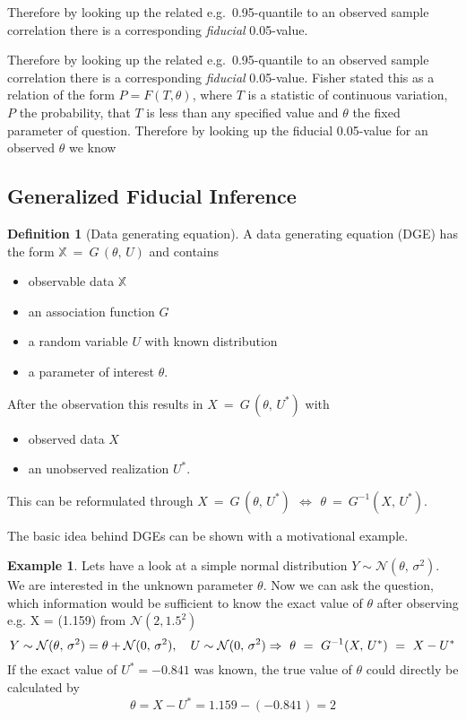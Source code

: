 \documentclass[
]{report}
\theoremstyle{definition}
\newtheorem{definition}{Definition}[section]
\newtheorem{example}{Example}[section]
\begin{document}
Therefore by looking up the related e.g.~0.95-quantile to an observed
sample correlation there is a corresponding \textit{fiducial}
0.05-value.

Therefore by looking up the related e.g.~0.95-quantile to an observed
sample correlation there is a corresponding \textit{fiducial}
0.05-value. Fisher stated this as a relation of the form
\(P = F(T, \theta)\), where \(T\) is a statistic of continuous
variation, \(P\) the probability, that \(T\) is less than any specified
value and \(\theta\) the fixed parameter of question. Therefore by
looking up the fiducial 0.05-value for an observed \(\theta\) we know

\subsection{Generalized Fiducial Inference}

\begin{definition}[Data generating equation]
A data generating equation (DGE) has the form $\mathbb{X} \ = \  G \, (\theta, \, U)$ and contains
\begin{itemize}
  \item observable data $\mathbb{X}$
  \item an association function $G$
  \item a random variable $U$ with known distribution
  \item a parameter of interest $\theta$.
\end{itemize}
After the observation this results in $X \ = \ G \, (\theta, \, U^*)$ with
\begin{itemize}
  \item observed data $X$
  \item an unobserved realization $U^*$.
\end{itemize}
\end{definition}

This can be reformulated through
\(X \ = \ G \, (\theta, \, U^*) \ \, \Leftrightarrow \ \, \theta \ = \ G^{-1}(X, \, U^*)\).

The basic idea behind DGEs can be shown with a motivational example.

\begin{example}
Lets have a look at a simple normal distribution $Y \sim \mathcal{N}(\theta,\, \sigma^2)$. We are interested in the unknown parameter $\theta$. Now we can ask the question, which information would be sufficient to know the exact value of $\theta$ after observing e.g. X = (1.159) from $\mathcal{N}(2, 1.5^2)$
$$Y \sim \mathcal{N}(\theta,\, \sigma^2) = \theta + \mathcal{N}(0,\, \sigma^2), \quad U \sim \mathcal{N}(0,\, \sigma^2) \newline
\Rightarrow \ \theta \ = \ G^{-1}(X, \, U^*) \ = \ X - U^*$$
If the exact value of $U^* = -0.841$ was known, the true value of $\theta$ could directly be calculated by
$$\theta = X- U^* = 1.159 - (-0.841) = 2$$
\end{example}
\end{document}
